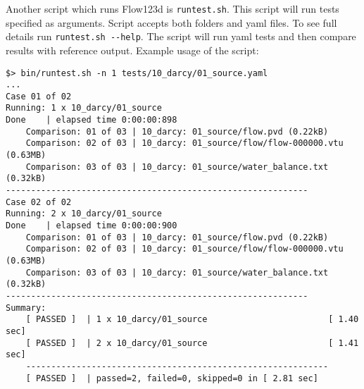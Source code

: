 Another script which runs Flow123d is \verb'runtest.sh'. This script will run tests specified as arguments. Script accepts both folders
and yaml files. To see full details run \verb'runtest.sh --help'. The script will run yaml tests and then compare results with reference
output. Example usage of the script:

\begin{verbatim}
$> bin/runtest.sh -n 1 tests/10_darcy/01_source.yaml
...
Case 01 of 02
Running: 1 x 10_darcy/01_source
Done    | elapsed time 0:00:00:898
    Comparison: 01 of 03 | 10_darcy: 01_source/flow.pvd (0.22kB)
    Comparison: 02 of 03 | 10_darcy: 01_source/flow/flow-000000.vtu (0.63MB)
    Comparison: 03 of 03 | 10_darcy: 01_source/water_balance.txt (0.32kB)
------------------------------------------------------------
Case 02 of 02
Running: 2 x 10_darcy/01_source
Done    | elapsed time 0:00:00:900
    Comparison: 01 of 03 | 10_darcy: 01_source/flow.pvd (0.22kB)
    Comparison: 02 of 03 | 10_darcy: 01_source/flow/flow-000000.vtu (0.63MB)
    Comparison: 03 of 03 | 10_darcy: 01_source/water_balance.txt (0.32kB)
------------------------------------------------------------
Summary:
    [ PASSED ]  | 1 x 10_darcy/01_source                        [ 1.40 sec]
    [ PASSED ]  | 2 x 10_darcy/01_source                        [ 1.41 sec]
    ------------------------------------------------------------
    [ PASSED ]  | passed=2, failed=0, skipped=0 in [ 2.81 sec]

\end{verbatim}
